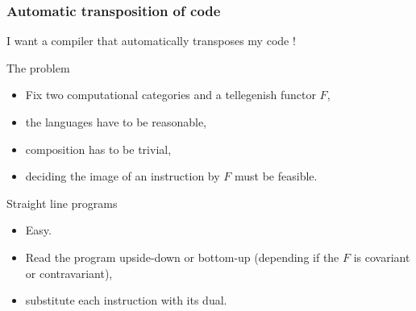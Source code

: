 \documentclass[10pt]{beamer}
\begin{document}
\begin{frame}
  \frametitle{Automatic transposition of code}

  \begin{center}
    \Large
    I want a compiler that automatically transposes my code !
  \end{center}

  \begin{block}{The problem}
    \begin{itemize}
    \item Fix two computational categories and a tellegenish functor $F$,
    \item the languages have to be \alert{reasonable},
    \item composition has to be \alert{trivial},
    \item deciding the image of an instruction by $F$ must be
      \alert{feasible}.
    \end{itemize}
  \end{block}

  \begin{block}{Straight line programs}
    \begin{itemize}
    \item Easy.
    \item Read the program upside-down or bottom-up (depending if the
      $F$ is covariant or contravariant),
    \item substitute each instruction with its dual.
    \end{itemize}
  \end{block}

\end{frame}
\end{document}
